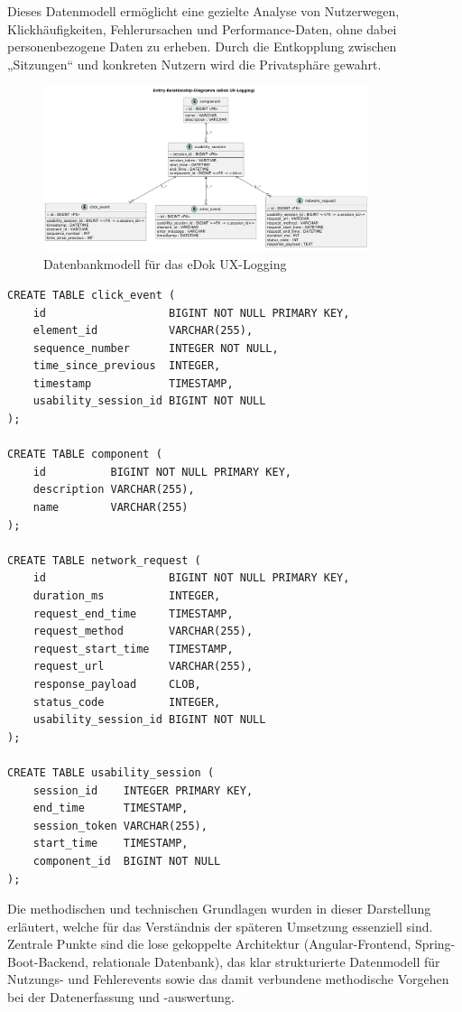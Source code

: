 \documentclass[12pt,oneside]{article}
\begin{document}
Dieses Datenmodell ermöglicht eine gezielte Analyse von Nutzerwegen, Klickhäufigkeiten, Fehlerursachen und Performance-Daten, ohne dabei personenbezogene Daten zu erheben. Durch die Entkopplung zwischen „Sitzungen“ und konkreten Nutzern wird die Privatsphäre gewahrt.
\begin{figure}[htb]
  \centering
  \includegraphics[width=0.85\textwidth]{erd-logging.png}
  \caption{Datenbankmodell für das eDok UX-Logging}
  \label{fig:erd-logging}
\end{figure}

\lstset{style=sql}
\begin{lstlisting}
CREATE TABLE click_event (
    id                   BIGINT NOT NULL PRIMARY KEY,
    element_id           VARCHAR(255),
    sequence_number      INTEGER NOT NULL,
    time_since_previous  INTEGER,
    timestamp            TIMESTAMP,
    usability_session_id BIGINT NOT NULL
);

CREATE TABLE component (
    id          BIGINT NOT NULL PRIMARY KEY,
    description VARCHAR(255),
    name        VARCHAR(255)
);

CREATE TABLE network_request (
    id                   BIGINT NOT NULL PRIMARY KEY,
    duration_ms          INTEGER,
    request_end_time     TIMESTAMP,
    request_method       VARCHAR(255),
    request_start_time   TIMESTAMP,
    request_url          VARCHAR(255),
    response_payload     CLOB,
    status_code          INTEGER,
    usability_session_id BIGINT NOT NULL
);

CREATE TABLE usability_session (
    session_id    INTEGER PRIMARY KEY,
    end_time      TIMESTAMP,
    session_token VARCHAR(255),
    start_time    TIMESTAMP,
    component_id  BIGINT NOT NULL
);
\end{lstlisting}

 

Die methodischen und technischen Grundlagen wurden in dieser Darstellung erläutert, welche für das Verständnis der späteren Umsetzung essenziell sind. Zentrale Punkte sind die lose gekoppelte Architektur (Angular-Frontend, Spring-Boot-Backend, relationale Datenbank), das klar strukturierte Datenmodell für Nutzungs- und Fehlerevents sowie das damit verbundene methodische Vorgehen bei der Datenerfassung und -auswertung.
\end{document}
